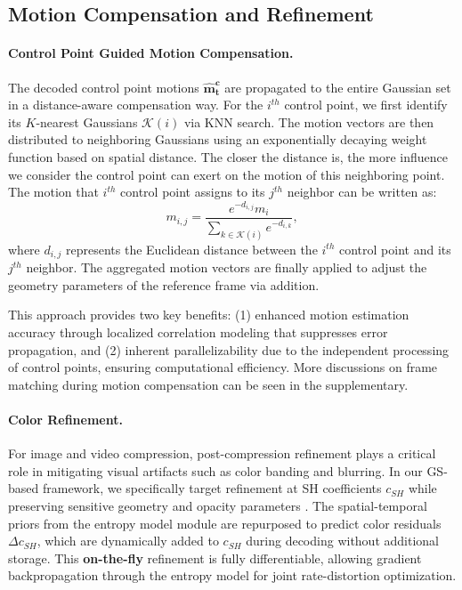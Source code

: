 \documentclass[letterpaper]{article} %
\begin{document}
 
\subsection{Motion Compensation and Refinement}
\label{sec:frame_recon}


\paragraph{\textbf{Control Point Guided Motion Compensation.}}
The decoded control point motions $\boldsymbol{\hat{m}^c_t}$ are propagated to the entire Gaussian set in a distance-aware compensation way. For the $i^{th}$ control point, we first identify its $K$-nearest Gaussians $\mathcal{K}(i)$ via KNN search. The motion vectors are then distributed to neighboring Gaussians using an exponentially decaying weight function based on spatial distance. The closer the distance is, the more influence we consider the control point can exert on the motion of this neighboring point. The motion that $i^{th}$ control point assigns to its $j^{th}$ neighbor can be written as:
\begin{equation}
m_{i,j} = \frac{e^{-d_{i, j}} m_i}{\sum_{k\in \mathcal{K}(i)}e^{-d_{i, k}}},
\end{equation}
where $d_{i, j}$ represents the Euclidean distance between the $i^{th}$ control point and its $j^{th}$ neighbor. The aggregated motion vectors are finally applied to adjust the geometry parameters of the reference frame via addition. 

This approach provides two key benefits: (1) enhanced motion estimation accuracy through localized correlation modeling that suppresses error propagation, and (2) inherent parallelizability due to the independent processing of control points, ensuring computational efficiency. More discussions on frame matching during motion compensation can be seen in the supplementary.


\paragraph{\textbf{Color Refinement.}}
For image and video compression, post-compression refinement plays a critical role in mitigating visual artifacts such as color banding and blurring. 
%
In our GS-based framework, we specifically target refinement at SH coefficients $c_{SH}$ while preserving sensitive geometry and opacity parameters \cite{chen2024fast, girish2024queen, papantonakis2024reducing}.
%
The spatial-temporal priors from the entropy model module are repurposed to predict color residuals $\Delta c_{SH}$, which are dynamically added to $c_{SH}$ during decoding without additional storage. This \textbf{on-the-fly} refinement is fully differentiable, allowing gradient backpropagation through the entropy model for joint rate-distortion optimization.
\end{document}
